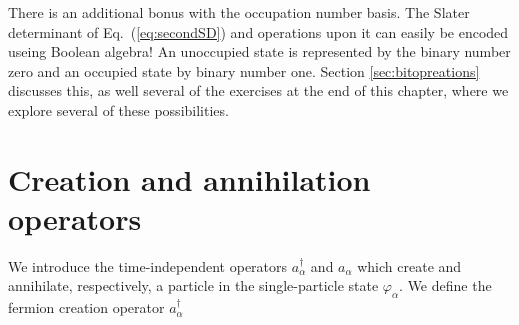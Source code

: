 There is an additional bonus with the occupation number basis. The Slater determinant of Eq.~(\ref{eq:secondSD}) and operations upon it 
can easily be encoded useing Boolean algebra!  An unoccupied state is represented by the binary number zero and an occupied state by binary number one.  Section \ref{sec:bitopreations} discusses this, as well several of the exercises at the end of this chapter, where we explore several of these possibilities. 




\section{Creation and annihilation operators}



We introduce the time-independent  operators
$a_\alpha^\dagger$ and $a_\alpha$   which create and annihilate, respectively, a particle 
in the single-particle state 
$\varphi_\alpha$. 
We define the fermion creation operator
$a_\alpha^\dagger$ 
